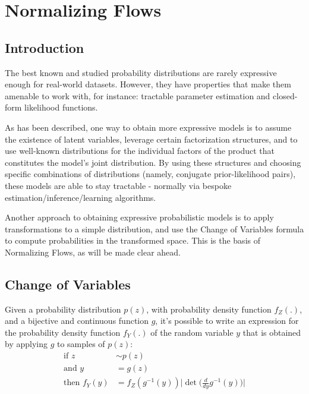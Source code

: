 \chapter{Normalizing Flows}
\label{chapter:probmodel}

\section{Introduction}
The best known and studied probability distributions are rarely expressive
enough for real-world datasets. However, they have properties that make them
amenable to work with, for instance: tractable parameter estimation and closed-form
likelihood functions.

As has been described, one way to obtain more expressive models is to assume the
existence of latent variables, leverage certain factorization structures, and to
use well-known distributions for the individual factors of the product that
constitutes the model's joint distribution. By using these structures and choosing
specific combinations of distributions (namely, conjugate prior-likelihood pairs),
these models are able to stay tractable - normally via bespoke estimation/inference/learning
algorithms.


Another approach to obtaining expressive probabilistic models is to apply
transformations to a simple distribution, and use the Change of Variables
formula to compute probabilities in the transformed space. This is the basis
of Normalizing Flows, as will be made clear ahead.

\section{Change of Variables}
Given a probability distribution $p(z)$, with probability density function $f_Z(.)$,
and a bijective and continuous function $g$, it's possible to write an expression
for the probability density function $f_Y(.)$ of the random variable $y$ that is
obtained by applying $g$ to samples of $p(z)$:
\begin{align}
    \mbox{if } z &\sim p(z) \\
    \mbox{and } y &= g(z) \\
    \mbox{then } f_Y(y) &= f_Z(g^{-1}(y))\Big|\det\Big(\frac{d}{dy}g^{-1}(y)\Big)\Big|
\end{align}

